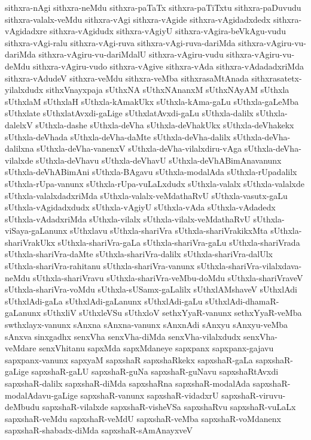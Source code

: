 {sithxra-nAgi
sithxra-neMdu
sithxra-paTaTx
sithxra-paTiTxtu
sithxra-paDuvudu
sithxra-valalx-veMdu
sithxra-vAgi
sithxra-vAgide
sithxra-vAgidadxdedx
sithxra-vAgidadxre
sithxra-vAgidudx
sithxra-vAgiyU
sithxra-vAgira-beVkAgu-vudu
sithxra-vAgi-ralu
sithxra-vAgi-ruva
sithxra-vAgi-ruva-dariMda
sithxra-vAgiru-vu-dariMda
sithxra-vAgiru-vu-dariMdalU
sithxra-vAgiru-vudu
sithxra-vAgiru-vu-deMdu
sithxra-vAgiru-vudo
sithxra-vAgive
sithxra-vAda
sithxra-vAdadadxriMda
sithxra-vAdudeV
sithxra-veMdu
sithxra-veMba
sithxrasaMtAnada
sithxrasatetx-yilalxdudx
sithxVnayxpaja
sUthxNA
sUthxNAnanxM
sUthxNAyAM
sUthxla
sUthxlaM
sUthxlaH
sUthxla-kAmakUkx
sUthxla-kAma-gaLu
sUthxla-gaLeMba
sUthxlate
sUthxlatAvxdi-gaLige
sUthxlatAvxdi-gaLu
sUthxla-dalilx
sUthxla-dalelxV
sUthxla-dashe
sUthxla-deVha
sUthxla-deVhakUkx
sUthxla-deVhakekx
sUthxla-deVhada
sUthxla-deVha-daMte
sUthxla-deVha-dalilx
sUthxla-deVha-dalilxna
sUthxla-deVha-vanenxV
sUthxla-deVha-vilalxdiru-vAga
sUthxla-deVha-vilalxde
sUthxla-deVhavu
sUthxla-deVhavU
sUthxla-deVhABimAnavanunx
sUthxla-deVhABimAni
sUthxla-BAgavu
sUthxla-modalAda
sUthxla-rUpadalilx
sUthxla-rUpa-vanunx
sUthxla-rUpa-vuLaLxdudx
sUthxla-valalx
sUthxla-valalxde
sUthxla-valalxdadxriMda
sUthxla-valalx-veMdathaRvU
sUthxla-vasutx-gaLu
sUthxla-vAgidadxdudx
sUthxla-vAgiyU
sUthxla-vAda
sUthxla-vAdadedx
sUthxla-vAdadxriMda
sUthxla-vilalx
sUthxla-vilalx-veMdathaRvU
sUthxla-viSaya-gaLanunx
sUthxlavu
sUthxla-shariVra
sUthxla-shariVrakikxMta
sUthxla-shariVrakUkx
sUthxla-shariVra-gaLa
sUthxla-shariVra-gaLu
sUthxla-shariVrada
sUthxla-shariVra-daMte
sUthxla-shariVra-dalilx
sUthxla-shariVra-dalUlx
sUthxla-shariVra-rahitanu
sUthxla-shariVra-vanunx
sUthxla-shariVra-vilalxdava-neMdu
sUthxla-shariVravu
sUthxla-shariVra-veMbu-doMdu
sUthxla-shariVraveV
sUthxla-shariVra-voMdu
sUthxla-sUSamx-gaLalilx
sUthxlAMshaveV
sUthxlAdi
sUthxlAdi-gaLa
sUthxlAdi-gaLanunx
sUthxlAdi-gaLu
sUthxlAdi-dhamaR-gaLanunx
sUthxliV
sUthxleVSu
sUthxloV
sethxYyaR-vanunx
sethxYyaR-veMba
swthxlayx-vanunx
sAnxna
sAnxna-vanunx
sAnxnAdi
sAnxyu
sAnxyu-veMba
sAnxva
sinxgadhx
senxVha
senxVha-diMda
senxVha-vilalxdudx
senxVha-veMdare
senxVhitanu
sapxMda
sapxMdaneye
sapxpanx
sapxpanx-gajavu
sapxpanx-vanunx
sapxyaM
sapxshaR
sapxshaRkekx
sapxshaR-gaLa
sapxshaR-gaLige
sapxshaR-gaLU
sapxshaR-guNa
sapxshaR-guNavu
sapxshaRtAvxdi
sapxshaR-dalilx
sapxshaR-diMda
sapxshaRna
sapxshaR-modalAda
sapxshaR-modalAdavu-gaLige
sapxshaR-vanunx
sapxshaR-vidadxrU
sapxshaR-viruvu-deMbudu
sapxshaR-vilalxde
sapxshaR-visheVSa
sapxshaRvu
sapxshaR-vuLaLx
sapxshaR-veMdu
sapxshaR-veMdU
sapxshaR-veMba
sapxshaR-voMdanenx
sapxshaR-shabadx-diMda
sapxshaR-sAmAnayxveV
}
